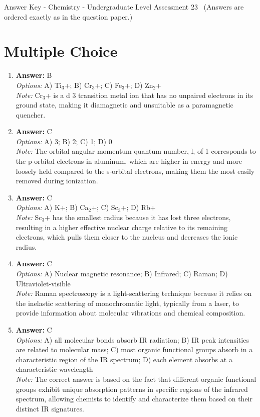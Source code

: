\documentclass[12pt]{article}
\begin{document}
\begin{center}
Answer Key - Chemistry - Undergraduate Level Assessment 23 \
\small (Answers are ordered exactly as in the question paper.)
\end{center}

\section*{Multiple Choice}
\begin{enumerate}[label=\arabic*.]
\item \textbf{Answer:} B
\\ \textit{Options:} A) Ti$_{3}$+; B) Cr$_{3}$+; C) Fe$_{3}$+; D) Zn$_{2}$+
\\ \textit{Note:} Cr$_{3}$+ is a d 3 transition metal ion that has no unpaired electrons in its ground state, making it diamagnetic and unsuitable as a paramagnetic quencher.
\item \textbf{Answer:} C
\\ \textit{Options:} A) 3; B) 2; C) 1; D) 0
\\ \textit{Note:} The orbital angular momentum quantum number, l, of 1 corresponds to the p-orbital electrons in aluminum, which are higher in energy and more loosely held compared to the s-orbital electrons, making them the most easily removed during ionization.
\item \textbf{Answer:} C
\\ \textit{Options:} A) K+; B) Ca$_{2}$+; C) Sc$_{3}$+; D) Rb+
\\ \textit{Note:} Sc$_{3}$+ has the smallest radius because it has lost three electrons, resulting in a higher effective nuclear charge relative to its remaining electrons, which pulls them closer to the nucleus and decreases the ionic radius.
\item \textbf{Answer:} C
\\ \textit{Options:} A) Nuclear magnetic resonance; B) Infrared; C) Raman; D) Ultraviolet-visible
\\ \textit{Note:} Raman spectroscopy is a light-scattering technique because it relies on the inelastic scattering of monochromatic light, typically from a laser, to provide information about molecular vibrations and chemical composition.
\item \textbf{Answer:} C
\\ \textit{Options:} A) all molecular bonds absorb IR radiation; B) IR peak intensities are related to molecular mass; C) most organic functional groups absorb in a characteristic region of the IR spectrum; D) each element absorbs at a characteristic wavelength
\\ \textit{Note:} The correct answer is based on the fact that different organic functional groups exhibit unique absorption patterns in specific regions of the infrared spectrum, allowing chemists to identify and characterize them based on their distinct IR signatures.
\end{enumerate}
\end{document}
